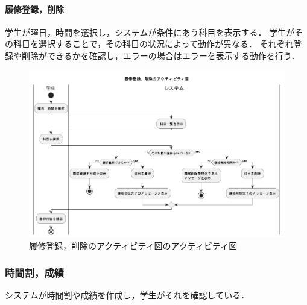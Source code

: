 \documentclass[documentclass]{jsarticle}
\begin{document}
\paragraph*{履修登録，削除}
学生が曜日，時間を選択し，システムが条件にあう科目を表示する．
学生がその科目を選択することで，その科目の状況によって動作が異なる．
それぞれ登録や削除ができるかを確認し，エラーの場合はエラーを表示する動作を行う．

\begin{figure}[H]
  \begin{center}
    \includegraphics*[scale=0.4]{figure/7-2.png}
  \end{center}
  \caption{履修登録，削除のアクティビティ図のアクティビティ図}
  \label{fig:7-2}
\end{figure}

\subsubsection*{時間割，成績}
システムが時間割や成績を作成し，学生がそれを確認している．
\end{document}
